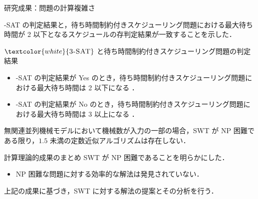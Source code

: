 \documentclass[dvipdfmx]{beamer}
\begin{document}
    \begin{frame}{研究成果：問題の計算複雑さ}

      {-SAT} の判定結果と，待ち時間制約付きスケジューリング問題における最大待ち時間が \alert{2 以下}となるスケジュールの存判定結果が一致することを示した．

      \begin{block}{${\textcolor{white}{\mbox {\sc 3-SAT}}}$ と待ち時間制約付きスケジューリング問題の判定結果}
        \begin{itemize}
          \item {-SAT} の判定結果が \alert{Yes} のとき，待ち時間制約付きスケジューリング問題における最大待ち時間は \alert{2 以下}になる ．
          \item {-SAT} の判定結果が \alert{No} のとき，待ち時間制約付きスケジューリング問題における最大待ち時間は \alert{3 以上}になる ．
        \end{itemize}
      \end{block}
      無関連並列機械モデルにおいて機械数が入力の一部の場合，SWT が NP 困難である限り，$1.5$ 未満の定数近似アルゴリズムは存在しない．
      \begin{alertblock}{計算理論的成果のまとめ}
        SWT が NP 困難であることを明らかにした．
        \begin{itemize}
          \item NP 困難な問題に対する効率的な解法は発見されていない．
        \end{itemize}
      \end{alertblock}
      上記の成果に基づき，SWT に対する解法の提案とその分析を行う．
    \end{frame}
\end{document}
